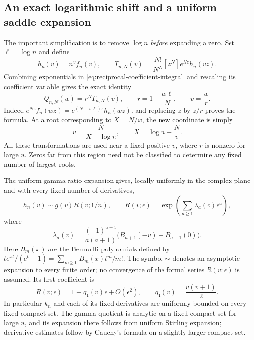 \documentclass[11pt]{article}
\numberwithin{equation}{section}
\theoremstyle{definition}
\theoremstyle{remark}
\begin{document}
\subsection{An exact logarithmic shift and a uniform saddle expansion}

The important simplification is to remove $\log n$ \emph{before}
expanding a zero.  Set $\ell=\log n$ and define
\begin{equation}\label{eq:log-shifted-transform}
 h_n(v)=n^v f_n(v),\qquad
 T_{n,N}(v)=\frac{N!}{N^N}[z^N]e^{Nz}h_n(vz).
\end{equation}
Combining exponentials in \eqref{eq:reciprocal-coefficient-integral}
and rescaling its coefficient variable gives the exact identity
\begin{equation}\label{eq:exact-logarithmic-shift}
 Q_{n,N}(w)=r^N T_{n,N}(v),\qquad
 r=1-\frac{w\ell}{N},\qquad v=\frac wr.
\end{equation}
Indeed $e^{Nz}f_n(wz)=e^{(N-w\ell)z}h_n(wz)$, and replacing
$z$ by $z/r$ proves the formula.  At a root corresponding to
$X=N/w$, the new coordinate is simply
\begin{equation}\label{eq:shifted-reciprocal-coordinate}
 v=\frac{N}{X-\log n},\qquad X=\log n+\frac Nv.
\end{equation}
All these transformations are used near a fixed positive $v$, where
$r$ is nonzero for large $n$.  Zeros far from this region need not
be classified to determine any fixed number of largest roots.

The uniform gamma-ratio expansion \cite[\S5.11]{DLMFGamma} gives,
locally uniformly in the complex plane and with every fixed number
of derivatives,
\begin{equation}\label{eq:gamma-ratio-full}
 h_n(v)\sim g(v)R(v;1/n),\qquad
 R(v;\epsilon)=\exp\left(\sum_{a\geq1}\lambda_a(v)\epsilon^a\right),
\end{equation}
where
\begin{equation}\label{eq:gamma-ratio-Bernoulli}
 \lambda_a(v)=\frac{(-1)^{a+1}}{a(a+1)}
      \bigl(B_{a+1}(-v)-B_{a+1}(0)\bigr).
\end{equation}
Here $B_m(x)$ are the Bernoulli polynomials defined by
$t e^{xt}/(e^t-1)=\sum_{m\geq0}B_m(x)t^m/m!$.
The symbol $\sim$ denotes an asymptotic expansion to every finite
order; no convergence of the formal series $R(v;\epsilon)$ is
assumed.  Its first coefficient is
\begin{equation}\label{eq:gamma-ratio-edge}
 R(v;\epsilon)=1+q_1(v)\epsilon+O(\epsilon^2),\qquad
 q_1(v)=\frac{v(v+1)}2.
\end{equation}
In particular $h_n$ and each of its fixed derivatives are uniformly
bounded on every fixed compact set.  The gamma quotient is analytic
on a fixed compact set for large $n$, and its expansion there follows
from uniform Stirling expansion; derivative estimates follow by
Cauchy's formula on a slightly larger compact set.
\end{document}
